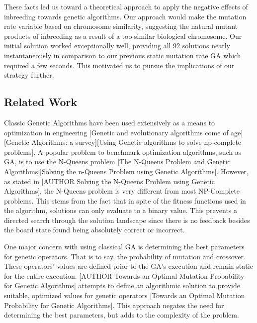 \documentclass{sig-alternate}
\begin{document}
These facts led us toward a theoretical approach to apply the negative effects of inbreeding towards genetic algorithms. Our approach would make the mutation rate variable based on chromosome similarity, suggesting the natural mutant products of inbreeding as a result of a too-similar biological chromosome. Our initial solution worked exceptionally well, providing all 92 solutions nearly instantaneously in comparison to our previous static mutation rate GA which required a few seconds. This motivated us to pursue the implications of our strategy further.

\subsection{Related Work}

Classic Genetic Algorithms have been used extensively as a means to optimization in engineering [Genetic and evolutionary algorithms come of age][Genetic Algorithms: a survey][Using Genetic algorithms to solve np-complete problems]. A popular problem to benchmark optimization algorithms, such as GA, is to use the N-Queens problem [The N-Queens Problem and Genetic Algorithms][Solving the n-Queens Problem using Genetic Algorithms]. However, as stated in [AUTHOR Solving the N-Queens Problem using Genetic Algorithms], the N-Queens problem is very different from most NP-Complete problems. This stems from the fact that in spite of the fitness functions used in the algorithm, solutions can only evaluate to a binary value. This prevents a directed search through the solution landscape since there is no feedback besides the board state found being absolutely correct or incorrect. 

One major concern with using classical GA is determining the best parameters for genetic operators. That is to say, the probability of mutation and crossover. These operators' values are defined prior to the GA's  execution and remain static for the entire execution. [AUTHOR Towards an Optimal Mutation Probability for Genetic Algorithms] attempts to define an algorithmic solution to provide suitable, optimized values for genetic operators [Towards an Optimal Mutation Probability for Genetic Algorithms]. This approach negates the need for determining the best parameters, but adds to the complexity of the problem.
\end{document}
